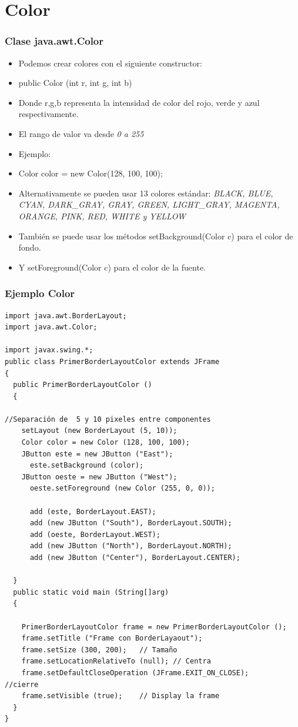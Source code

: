 \documentclass{beamer}
\begin{document}
\section*{Color}
\begin{frame}[fragile]
\frametitle{Clase java.awt.Color}
\begin{itemize}[<+->]
\item Podemos crear colores con el siguiente constructor:
\item \alert{public Color (int r, int g, int b)}
\item Donde \alert{r,g,b} representa la intensidad de color del rojo, verde y azul respectivamente.
\item El rango de valor va desde \emph{0 a 255}
\item Ejemplo:
\item Color color = new Color(128, 100, 100);
\item Alternativamente se pueden usar 13 colores estándar: \emph{BLACK, BLUE, CYAN, DARK\_GRAY, GRAY, GREEN, LIGHT\_GRAY, MAGENTA, ORANGE, PINK, RED, WHITE y YELLOW}
\item También se puede usar los métodos \alert{setBackground(Color c)} para el color de fondo.
\item Y \alert{setForeground(Color c)} para el color de la fuente.
\end{itemize}
\end{frame}



\begin{frame}[fragile]
\frametitle{Ejemplo Color}
\begin{tiny}
\begin{verbatim}
import java.awt.BorderLayout;
import java.awt.Color;

import javax.swing.*;
public class PrimerBorderLayoutColor extends JFrame
{
  public PrimerBorderLayoutColor ()
  {

//Separación de  5 y 10 pixeles entre componentes
    setLayout (new BorderLayout (5, 10));
    Color color = new Color (128, 100, 100);
    JButton este = new JButton ("East");
      este.setBackground (color);
    JButton oeste = new JButton ("West");
      oeste.setForeground (new Color (255, 0, 0));

      add (este, BorderLayout.EAST);
      add (new JButton ("South"), BorderLayout.SOUTH);
      add (oeste, BorderLayout.WEST);
      add (new JButton ("North"), BorderLayout.NORTH);
      add (new JButton ("Center"), BorderLayout.CENTER);

  }
  public static void main (String[]arg)
  {

    PrimerBorderLayoutColor frame = new PrimerBorderLayoutColor ();
    frame.setTitle ("Frame con BorderLayaout");
    frame.setSize (300, 200);   // Tamaño
    frame.setLocationRelativeTo (null); // Centra
    frame.setDefaultCloseOperation (JFrame.EXIT_ON_CLOSE);      //cierre
    frame.setVisible (true);    // Display la frame
  }
}
\end{verbatim}
\end{tiny}
\end{frame}
\end{document}
